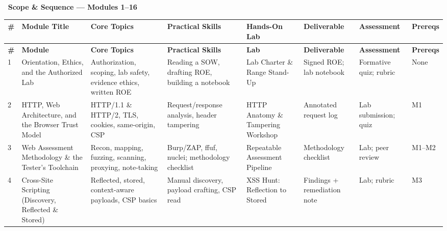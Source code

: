 \documentclass[11pt,letterpaper,oneside]{report}
\renewcommand{\arraystretch}{1.18}
\begin{document}
\begin{landscape}
\thispagestyle{plain}
\setlength\LTleft{0pt}\setlength\LTright{0pt}
\renewcommand{\arraystretch}{1.15}
\footnotesize
\noindent\colorbox{afnavy}{\parbox{\dimexpr\linewidth-2\fboxsep\relax}{\raggedright\color{white}\sffamily\bfseries\large\, Scope \& Sequence --- Modules 1--16\strut}}\par\nobreak\vspace{2pt}\nobreak
\setlength{\tabcolsep}{6pt}%
\begin{longtable}{@{}R{0.45cm} R{2.085cm} R{3.614cm} R{3.336cm} R{2.919cm} R{2.363cm} R{2.363cm} R{2.780cm}@{}}
\toprule
\sffamily\bfseries\# &
\sffamily\bfseries Module Title &
\sffamily\bfseries Core Topics &
\sffamily\bfseries Practical Skills &
\sffamily\bfseries Hands-On Lab &
\sffamily\bfseries Deliverable &
\sffamily\bfseries Assessment &
\sffamily\bfseries Prereqs \\
\midrule
\endfirsthead
\toprule
\sffamily\bfseries\# &
\sffamily\bfseries Module &
\sffamily\bfseries Core Topics &
\sffamily\bfseries Practical Skills &
\sffamily\bfseries Lab &
\sffamily\bfseries Deliverable &
\sffamily\bfseries Assessment &
\sffamily\bfseries Prereqs \\
\midrule
\endhead
\bottomrule
\endfoot

1 & Orientation, Ethics, and the Authorized Lab
  & Authorization, scoping, lab safety, evidence ethics, written ROE
  & Reading a SOW, drafting ROE, building a notebook
  & Lab Charter \& Range Stand-Up
  & Signed ROE; lab notebook
  & Formative quiz; rubric
  & None\\

2 & HTTP, Web Architecture, and the Browser Trust Model
  & HTTP/1.1 \& HTTP/2, TLS, cookies, same-origin, CSP
  & Request/response analysis, header tampering
  & HTTP Anatomy \& Tampering Workshop
  & Annotated request log
  & Lab submission; quiz
  & M1\\

3 & Web Assessment Methodology \& the Tester's Toolchain
  & Recon, mapping, fuzzing, scanning, proxying, note-taking
  & Burp/ZAP, ffuf, nuclei; methodology checklist
  & Repeatable Assessment Pipeline
  & Methodology checklist
  & Lab; peer review
  & M1--M2\\

4 & Cross-Site Scripting (Discovery, Reflected \& Stored)
  & Reflected, stored, context-aware payloads, CSP basics
  & Manual discovery, payload crafting, CSP read
  & XSS Hunt: Reflection to Stored
  & Findings + remediation note
  & Lab; rubric
  & M3\\


\end{longtable}
\end{landscape}
\end{document}
